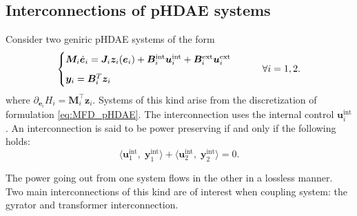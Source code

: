 \documentclass{svjour3}                     %
\begin{document}
\subsection{Interconnections of pHDAE systems}
Consider two geniric pHDAE systems of the form
\begin{equation}
\begin{cases}
\bm{M}_i \dot{\bm{e}}_i = \bm{J}_i \bm{z}_i(\bm{e}_i) + \bm{B}_i^{\text{int}} \bm{u}_i^{\text{int}} + \bm{B}_i^{\text{ext}} \bm{u}_i^{\text{ext}}  \vspace{2mm} \\
\bm{y}_i = \bm{B}_i^T  \bm{z}_i
\end{cases} \qquad \forall i = 1, 2.
\end{equation}
where $\partial_{\bm{e}_i} {H_i} = \bm{M}_i^\top \bm{z}_i$. Systems of this kind arise from the discretization of formulation \eqref{eq:MFD_pHDAE}. The interconnection uses the internal control $\bm{u}_i^{\text{int}}$. An interconnection is said to be power preserving if and only if the following holds:
\begin{equation} \label{eq:int_balance}
\langle \bm{u}_1^{\text{int}}, \; \bm{y}_1^{\text{int}} \rangle + \langle \bm{u}_2^{\text{int}}, \; \bm{y}_2^{\text{int}} \rangle = 0.
\end{equation}

The power going out from one system flows in the other in a lossless manner. Two main interconnections of this kind are of interest when coupling system: the gyrator and transformer interconnection.
\end{document}
